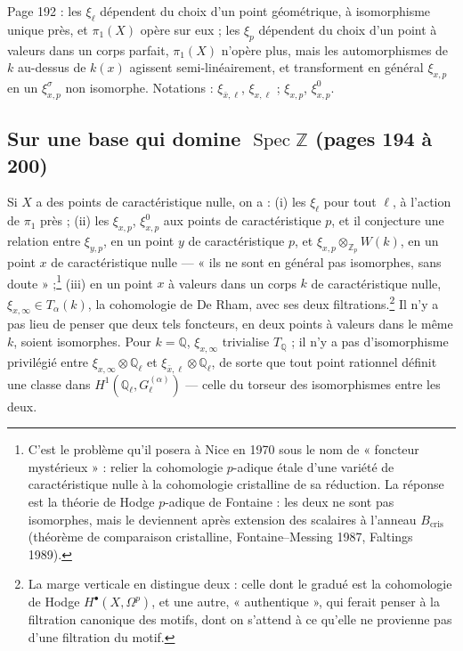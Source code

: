 \documentclass[11pt,a4paper]{article}
\begin{document}
Page 192 : les $\xi_{\ell}$ dépendent du choix d'un point géométrique, à
isomorphisme unique près, et $\pi_{1}(X)$ opère sur eux ; les $\xi_{p}$ dépendent
du choix d'un point à valeurs dans un corps parfait, $\pi_{1}(X)$ n'opère plus,
mais les automorphismes de $k$ au-dessus de $k(x)$ agissent semi-linéairement,
et transforment en général $\xi_{x,p}$ en un $\xi_{x,p}^{\sigma}$ non isomorphe.
Notations : $\xi_{\bar{x},\ell}$, $\xi_{x,\ell}$ ; $\xi_{x,p}$, $\xi_{x,p}^{0}$.

\subsection*{Sur une base qui domine $\operatorname{Spec} \mathbb{Z}$ (pages 194 à 200)}

Si $X$ a des points de caractéristique nulle, on a : (i) les $\xi_{\ell}$ pour
tout $\ell$, à l'action de $\pi_{1}$ près ; (ii) les $\xi_{x,p}$, $\xi_{x,p}^{0}$
aux points de caractéristique $p$, et il conjecture une relation entre
$\xi_{y,p}$, en un point $y$ de caractéristique $p$, et $\xi_{x,p}
\otimes_{\mathbb{Z}_{p}} W(k)$, en un point $x$ de caractéristique nulle ---
« ils ne sont en général pas isomorphes, sans doute » ;\footnote{C'est le
problème qu'il posera à Nice en 1970 sous le nom de « foncteur mystérieux » :
relier la cohomologie $p$-adique étale d'une variété de caractéristique nulle à
la cohomologie cristalline de sa réduction. La réponse est la théorie de Hodge
$p$-adique de Fontaine : les deux ne sont pas isomorphes, mais le deviennent
après extension des scalaires à l'anneau $B_{\mathrm{cris}}$ (théorème de
comparaison cristalline, Fontaine--Messing 1987, Faltings 1989).} (iii) en un
point $x$ à valeurs dans un corps $k$ de caractéristique nulle, $\xi_{x,\infty}
\in T_{\alpha}(k)$, la cohomologie de De Rham, avec ses deux
filtrations.\footnote{La marge verticale en distingue deux : celle dont le gradué
est la cohomologie de Hodge $H^{\bullet}(X, \Omega^{p})$, et une autre,
« authentique », qui ferait penser à la filtration canonique des motifs, dont on
s'attend à ce qu'elle ne provienne pas d'une filtration du motif.} Il n'y a pas
lieu de penser que deux tels foncteurs, en deux points à valeurs dans le même
$k$, soient isomorphes. Pour $k = \mathbb{Q}$, $\xi_{x,\infty}$ trivialise
$T_{\mathbb{Q}}$ ; il n'y a pas d'isomorphisme privilégié entre $\xi_{x,\infty}
\otimes \mathbb{Q}_{\ell}$ et $\xi_{\bar{x},\ell} \otimes \mathbb{Q}_{\ell}$, de
sorte que tout point rationnel définit une classe dans
$H^{1}(\mathbb{Q}_{\ell}, G_{\ell}^{(\alpha)})$ --- celle du torseur des
isomorphismes entre les deux.
\end{document}
